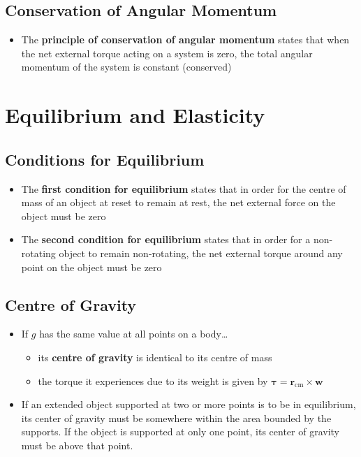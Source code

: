 \documentclass{article}
\begin{document}
\subsection{Conservation of Angular Momentum}

\begin{itemize}
  \item The \textbf{principle of conservation of angular momentum} states that when the net external torque acting on a system is zero, the total angular momentum of the system is constant (conserved)
\end{itemize}

\section{Equilibrium and Elasticity}

\subsection{Conditions for Equilibrium}

\begin{itemize}
  \item The \textbf{first condition for equilibrium} states that in order for the centre of mass of an object at reset to remain at rest, the net external force on the object must be zero

  \item The \textbf{second condition for equilibrium} states that in order for a non-rotating object to remain non-rotating, the net external torque around any point on the object must be zero
\end{itemize}

\subsection{Centre of Gravity}

\begin{itemize}
  \item If $g$ has the same value at all points on a body…

        \begin{itemize}
          \item its \textbf{centre of gravity} is identical to its centre of mass

          \item the torque it experiences due to its weight is given by $\boldsymbol \tau = \mathbf r_\textrm{cm} \times \mathbf w$
        \end{itemize}

  \item If an extended object supported at two or more points is to be in equilibrium, its center of gravity must be somewhere within the area bounded by the supports. If the object is supported at only one point, its center of gravity must be above that point.
\end{itemize}
\end{document}
